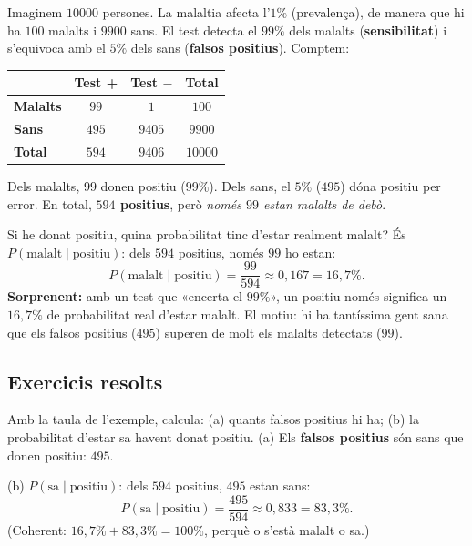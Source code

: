 \begin{exemple}
Imaginem $\num{10000}$ persones. La malaltia afecta l'\textbf{$1\%$} (prevalença), de
manera que hi ha $100$ malalts i $\num{9900}$ sans. El test detecta el $99\%$ dels
malalts (\textbf{sensibilitat}) i s'equivoca amb el $5\%$ dels sans (\textbf{falsos
positius}). Comptem:

\begin{center}
\renewcommand{\arraystretch}{1.3}
\begin{tabular}{l c c c}
\toprule
 & \textbf{Test +} & \textbf{Test $-$} & \textbf{Total} \\
\midrule
\textbf{Malalts} & $99$ & $1$ & $100$ \\
\textbf{Sans} & $495$ & $\num{9405}$ & $\num{9900}$ \\
\midrule
\textbf{Total} & $594$ & $\num{9406}$ & $\num{10000}$ \\
\bottomrule
\end{tabular}
\end{center}

Dels malalts, $99$ donen positiu ($99\%$). Dels sans, el $5\%$ ($495$) dóna positiu per
error. En total, \textbf{$594$ positius}, però \emph{només $99$ estan malalts de debò}.
\end{exemple}

\begin{exemple}
Si he donat positiu, quina probabilitat tinc d'estar realment malalt? És
$P(\text{malalt}\mid\text{positiu})$: dels $594$ positius, només $99$ ho estan:
\[
P(\text{malalt}\mid\text{positiu})=\frac{99}{594}\approx 0,167=16,7\%.
\]
\textbf{Sorprenent:} amb un test que «encerta el $99\%$», un positiu només significa un
$16,7\%$ de probabilitat real d'estar malalt. El motiu: hi ha tantíssima gent sana que
els falsos positius ($495$) superen de molt els malalts detectats ($99$).
\end{exemple}

\subsection{Exercicis resolts}

\begin{exresolt}
Amb la taula de l'exemple, calcula: (a) quants falsos positius hi ha; (b) la
probabilitat d'estar sa havent donat positiu.
\solucio
(a) Els \textbf{falsos positius} són sans que donen positiu: $495$.

(b) $P(\text{sa}\mid\text{positiu})$: dels $594$ positius, $495$ estan sans:
\[
P(\text{sa}\mid\text{positiu})=\frac{495}{594}\approx 0,833=83,3\%.
\]
(Coherent: $16,7\%+83,3\%=100\%$, perquè o s'està malalt o sa.)
\end{exresolt}

